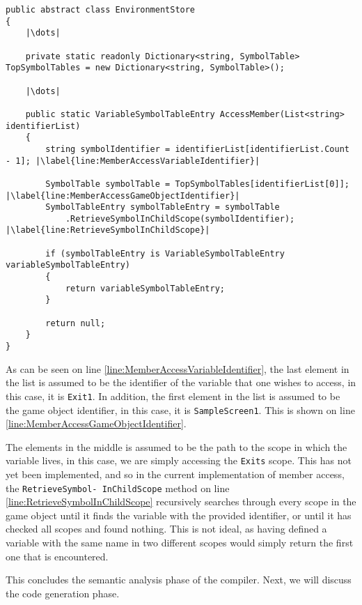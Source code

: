 \begin{lstlisting}[language=CSharp, caption={The \abstractsemanticclass{} class.}, label={lst:VisitAssignment},escapechar=|]
public abstract class EnvironmentStore
{
	|\dots|

	private static readonly Dictionary<string, SymbolTable> TopSymbolTables = new Dictionary<string, SymbolTable>();
	
	|\dots|

	public static VariableSymbolTableEntry AccessMember(List<string> identifierList)
	{
		string symbolIdentifier = identifierList[identifierList.Count - 1]; |\label{line:MemberAccessVariableIdentifier}|
		
		SymbolTable symbolTable = TopSymbolTables[identifierList[0]]; |\label{line:MemberAccessGameObjectIdentifier}|
		SymbolTableEntry symbolTableEntry = symbolTable
			.RetrieveSymbolInChildScope(symbolIdentifier); |\label{line:RetrieveSymbolInChildScope}|

		if (symbolTableEntry is VariableSymbolTableEntry variableSymbolTableEntry)
		{
			return variableSymbolTableEntry;
		}
		
		return null;
	}
}
\end{lstlisting}

As can be seen on line \ref{line:MemberAccessVariableIdentifier}, the last element in the list is assumed to be the identifier of the variable that one wishes to access, in this case, it is \texttt{Exit1}.
In addition, the first element in the list is assumed to be the game object identifier, in this case, it is \texttt{SampleScreen1}. 
This is shown on line \ref{line:MemberAccessGameObjectIdentifier}.

The elements in the middle is assumed to be the path to the scope in which the variable lives, in this case, we are simply accessing the \texttt{Exits} scope. 
This has not yet been implemented, and so in the current implementation of member access, the \texttt{RetrieveSymbol-
InChildScope} method on line \ref{line:RetrieveSymbolInChildScope} recursively searches through every scope in the game object until it finds the variable with the provided identifier, or until it has checked all scopes and found nothing. This is not ideal, as having defined a variable with the same name in two different scopes would simply return the first one that is encountered.


This concludes the semantic analysis phase of the compiler. Next, we will discuss the code generation phase.
